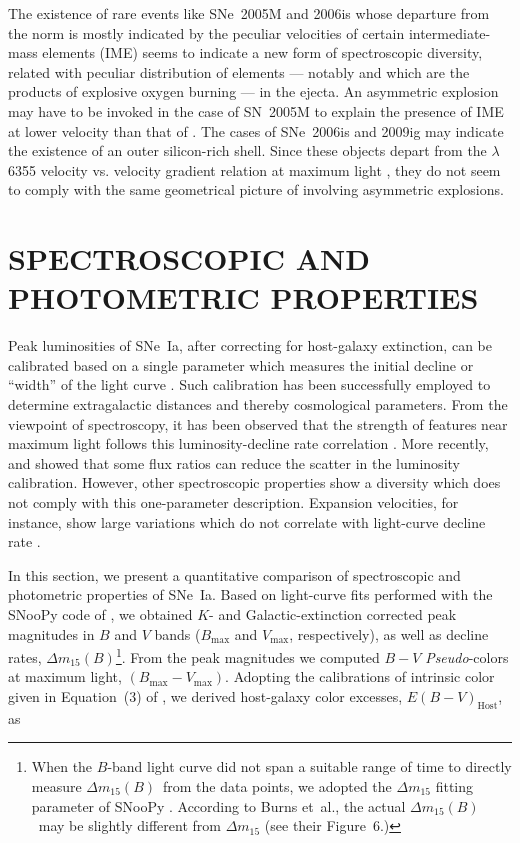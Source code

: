 \documentclass[apj]{emulateapj-rtx4}
\newcommand{\dm}{$\Delta m_{15}(B)$}
\newcommand{\sneia}{SNe~Ia}
\begin{document}
The existence of rare events like SNe~2005M and 2006is whose
departure from the norm is mostly indicated by the peculiar
velocities of certain intermediate-mass elements (IME) 
seems to indicate a new form of spectroscopic diversity, related
with peculiar distribution of elements --- notably
 and  which are the products of explosive oxygen
burning --- in the ejecta. An asymmetric explosion may have to be
invoked in the case of SN~2005M to explain 
the presence of IME at lower velocity than that of . The
cases of SNe~2006is and 2009ig may indicate the existence of an outer
silicon-rich shell. Since these objects depart from the 
 $\lambda$6355
velocity vs. velocity gradient relation at maximum light
\citep{foley11b}, they do not seem to comply with the same
geometrical picture of \citet{maeda10b} involving asymmetric
explosions.

\section{SPECTROSCOPIC AND PHOTOMETRIC PROPERTIES}
\label{sec:spphot}

Peak luminosities of \sneia,
after correcting for host-galaxy extinction, can be 
calibrated based on a single parameter which measures the initial
decline or ``width'' of the light curve
\citep{phillips93,phillips99}. Such calibration has been successfully
employed to determine extragalactic distances and thereby cosmological
parameters. From the viewpoint of spectroscopy, it has been observed
that the strength of  features near maximum light follows
this luminosity-decline rate correlation
\citep{nugent95,hachinger06,silverman12c}. More 
recently, \citet{bailey09} and \citet{blondin11a} showed that some flux ratios can
reduce the scatter in the luminosity calibration. However,
other spectroscopic properties show a diversity which does not comply
with this one-parameter description. Expansion velocities, for
instance, show large variations which do not correlate with
light-curve decline rate \citep{hatano00,benetti05}.  

In this section, we present a quantitative comparison of spectroscopic
and photometric properties of \sneia. Based on light-curve fits
performed with the SNooPy code of \citet{burns11}, we obtained $K$- and
Galactic-extinction corrected peak magnitudes in $B$ and $V$ bands
($B_{\mathrm{max}}$ and $V_{\mathrm{max}}$, respectively), as well as
decline rates, \dm\footnote{When the $B$-band light curve did not
  span a suitable range of time to directly measure \dm\ from the data
  points, we adopted the $\Delta m_{15}$ fitting parameter of SNooPy
\citep{burns11}. According to Burns et~al., the actual \dm\ may be
slightly different from $\Delta m_{15}$ (see their Figure~6.)}. From
the peak magnitudes we computed $B-V$ {\em 
  Pseudo}-colors at maximum light, $(B_{\mathrm{max}}-V_{\mathrm{max}})$.
Adopting the calibrations of intrinsic color given in Equation~(3) of
\citet{folatelli10}, we derived host-galaxy color 
excesses, $E(B-V)_{\mathrm{Host}}$, as
\end{document}
